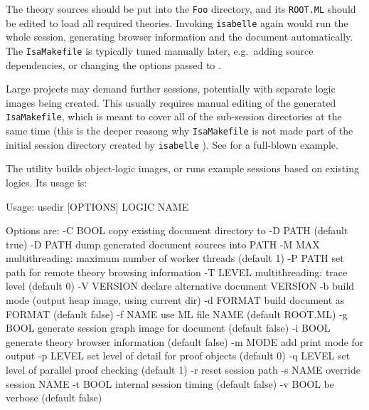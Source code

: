 \begin{isabellebody}
\begin{isamarkuptext}
  \noindent The theory sources should be put into the \verb|Foo|
  directory, and its \verb|ROOT.ML| should be edited to load all
  required theories.  Invoking \verb|isabelle| \hyperlink{tool.make}{\mbox{}} again
  would run the whole session, generating browser information and the
  document automatically.  The \verb|IsaMakefile| is typically
  tuned manually later, e.g.\ adding source dependencies, or changing
  the options passed to \hyperlink{tool.usedir}{\mbox{}}.

  \medskip Large projects may demand further sessions, potentially
  with separate logic images being created.  This usually requires
  manual editing of the generated \verb|IsaMakefile|, which is
  meant to cover all of the sub-session directories at the same time
  (this is the deeper reasong why \verb|IsaMakefile| is not made
  part of the initial session directory created by \verb|isabelle| \hyperlink{tool.mkdir}{\mbox{}}).  See \hyperlink{file.~~/src/HOL/IsaMakefile}{\mbox{}} for
  a full-blown example.%
\end{isamarkuptext}%
\isamarkuptrue%
%
\isamarkuptrue%
%
\begin{isamarkuptext}%
The \hypertarget{tool.usedir}{\hyperlink{tool.usedir}{\mbox{}}} utility builds object-logic images, or runs
  example sessions based on existing logics. Its usage is:
\begin{ttbox}

Usage: usedir [OPTIONS] LOGIC NAME

  Options are:
    -C BOOL      copy existing document directory to -D PATH (default true)
    -D PATH      dump generated document sources into PATH
    -M MAX       multithreading: maximum number of worker threads (default 1)
    -P PATH      set path for remote theory browsing information
    -T LEVEL     multithreading: trace level (default 0)
    -V VERSION   declare alternative document VERSION
    -b           build mode (output heap image, using current dir)
    -d FORMAT    build document as FORMAT (default false)
    -f NAME      use ML file NAME (default ROOT.ML)
    -g BOOL      generate session graph image for document (default false)
    -i BOOL      generate theory browser information (default false)
    -m MODE      add print mode for output
    -p LEVEL     set level of detail for proof objects (default 0)
    -q LEVEL     set level of parallel proof checking (default 1)
    -r           reset session path
    -s NAME      override session NAME
    -t BOOL      internal session timing (default false)
    -v BOOL      be verbose (default false)


\end{ttbox}
\end{isamarkuptext}
\end{isabellebody}
